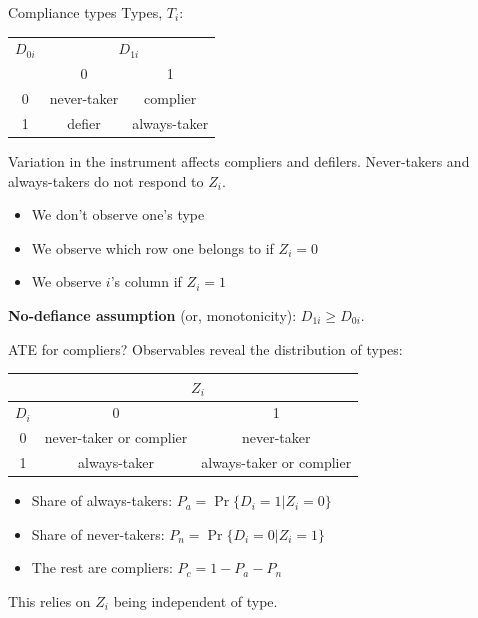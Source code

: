 \documentclass[notes=show,beamer,compress]{beamer}
\begin{document}
\begin{frame}{Compliance types}
	Types, $T_i$:
	\begin{center}
		\begin{tabular}{|c|c|c|}
			\hline
			$D_{0i}$ & \multicolumn{2}{|c|}{$D_{1i}$} \\
			&      0      &        1         \\ \hline
			0     & never-taker &     complier     \\ \hline
			1     &   defier    &   always-taker   \\ \hline
		\end{tabular}
	\end{center}
	Variation in the instrument affects compliers and defilers. Never-takers and always-takers do not respond to $Z_i$.
	\begin{itemize}
		\item We don't observe one's type
		\item We observe which row one belongs to if $Z_i=0$
		\item We observe $i$'s column if $Z_i=1$
	\end{itemize}
	\textbf{No-defiance assumption} (or, monotonicity): $D_{1i}\geq D_{0i}$. 
\end{frame}

\begin{frame}{ATE for compliers?}
	Observables reveal the distribution of types:
	\begin{center}
		\begin{tabular}{|c|c|c|}
			\hline
			& \multicolumn{2}{|c|}{$Z_{i}$}                      \\ \hline
			$D_{i}$ &            0            &            1             \\ \hline
			0    & never-taker or complier &       never-taker        \\ \hline
			1    &      always-taker       & always-taker or complier \\ \hline
		\end{tabular}
	\end{center}
	\begin{itemize}
		\item Share of always-takers: $P_a = \Pr\{D_i=1|Z_i=0\}$
		\item Share of never-takers: $P_n = \Pr\{D_i=0|Z_i=1\}$
		\item The rest are compliers: $P_c = 1 - P_a - P_n$
	\end{itemize}
	This relies on $Z_i$ being independent of type.
\end{frame}
\end{document}
